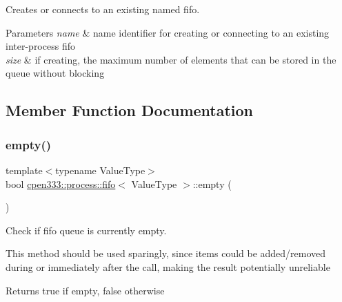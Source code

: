 Creates or connects to an existing named fifo. 


\begin{DoxyParams}{Parameters}
{\em name} & name identifier for creating or connecting to an existing inter-\/process fifo \\
\hline
{\em size} & if creating, the maximum number of elements that can be stored in the queue without blocking \\
\hline
\end{DoxyParams}


\subsection{Member Function Documentation}
\mbox{\label{classcpen333_1_1process_1_1fifo_ae2ce36a0885d0c3ded0997ec2586aabe}} 
\subsubsection{\texorpdfstring{empty()}{empty()}}
{\footnotesize\ttfamily template$<$typename Value\+Type$>$ \\
bool \hyperlink{classcpen333_1_1process_1_1fifo}{cpen333\+::process\+::fifo}$<$ Value\+Type $>$\+::empty (\begin{DoxyParamCaption}{ }\end{DoxyParamCaption})\hspace{0.3cm}{\ttfamily [inline]}}



Check if fifo queue is currently empty. 

This method should be used sparingly, since items could be added/removed during or immediately after the call, making the result potentially unreliable

\begin{DoxyReturn}{Returns}
{\ttfamily true} if empty, {\ttfamily false} otherwise 
\end{DoxyReturn}
\mbox{\label{classcpen333_1_1process_1_1fifo_ac501e62c2253097f89d713558d888d16}} 

